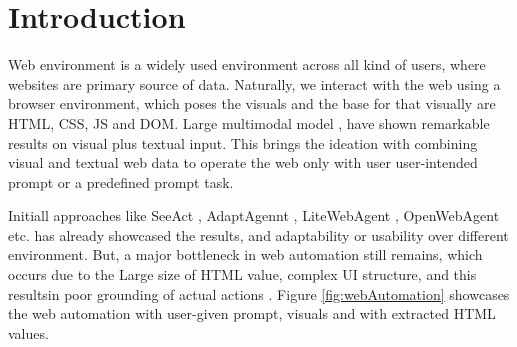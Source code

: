 \section{Introduction}

Web environment is a widely used environment across all kind of users, where websites are primary source of data. Naturally, we interact with the web using a browser environment, which poses the visuals and the base for that visually are HTML, CSS, JS and DOM. Large multimodal model \cite{LMM:Citation}, have shown remarkable results on visual plus textual input. This brings the ideation with combining visual and textual web data to operate the web only with user user-intended prompt or a predefined prompt task.

Initiall approaches like SeeAct \cite{SeeAct}, AdaptAgennt \cite{FewShotLearning:verma2024adaptagentadaptingmultimodalweb}, LiteWebAgent \cite{zhang2025litewebagentopensourcesuitevlmbased}, OpenWebAgent \cite{iong2024openwebagent} etc. has already showcased the results, and adaptability or usability over different environment. But, a major bottleneck in web automation still remains, which occurs due to the Large size of HTML value, complex UI structure, and this resultsin poor grounding of actual actions \cite{SeeAct}. Figure \ref{fig:webAutomation} showcases the web automation with user-given prompt, visuals and with extracted HTML values.

